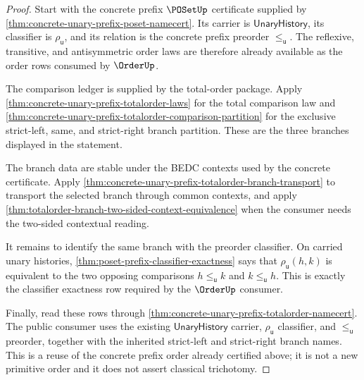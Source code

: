 \begin{proof}
Start with the concrete prefix $\POSetUp$ certificate supplied by
\autoref{thm:concrete-unary-prefix-poset-namecert}. Its carrier is
$\mathsf{UnaryHistory}$, its classifier is $\rho_{\mathsf{u}}$, and its
relation is the concrete prefix preorder $\le_{\mathsf{u}}$. The reflexive,
transitive, and antisymmetric order laws are therefore already available as the
order rows consumed by $\OrderUp$.

The comparison ledger is supplied by the total-order package. Apply
\autoref{thm:concrete-unary-prefix-totalorder-laws} for the total comparison
law and
\autoref{thm:concrete-unary-prefix-totalorder-comparison-partition} for the
exclusive strict-left, same, and strict-right branch partition. These are the
three branches displayed in the statement.

The branch data are stable under the BEDC contexts used by the concrete
certificate. Apply
\autoref{thm:concrete-unary-prefix-totalorder-branch-transport} to transport
the selected branch through common contexts, and apply
\autoref{thm:totalorder-branch-two-sided-context-equivalence} when the consumer
needs the two-sided contextual reading.

It remains to identify the same branch with the preorder classifier. On carried
unary histories, \autoref{thm:poset-prefix-classifier-exactness} says that
$\rho_{\mathsf{u}}(h,k)$ is equivalent to the two opposing comparisons
$h\le_{\mathsf{u}}k$ and $k\le_{\mathsf{u}}h$. This is exactly the classifier
exactness row required by the $\OrderUp$ consumer.

Finally, read these rows through
\autoref{thm:concrete-unary-prefix-totalorder-namecert}. The public consumer
uses the existing $\mathsf{UnaryHistory}$ carrier, $\rho_{\mathsf{u}}$
classifier, and $\le_{\mathsf{u}}$ preorder, together with the inherited
strict-left and strict-right branch names. This is a reuse of the concrete
prefix order already certified above; it is not a new primitive order and it
does not assert classical trichotomy.
\end{proof}

